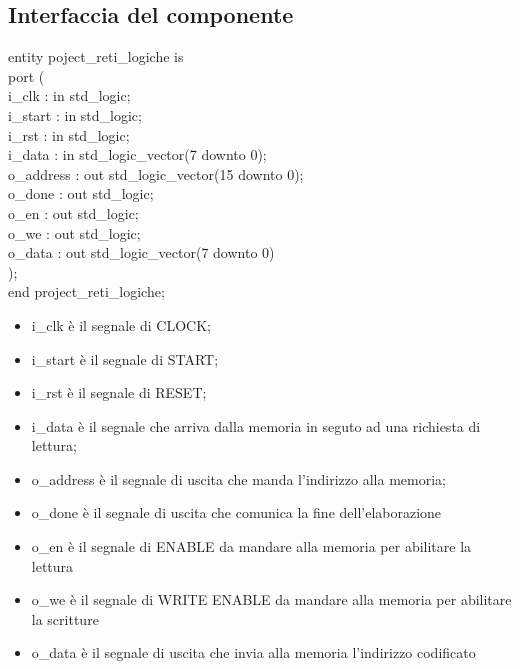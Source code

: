 \documentclass{article}
\newcommand\tab[1][1cm]{\hspace*{#1}}
\begin{document}
\subsection{Interfaccia del componente}
{\selectfont
entity poject\_reti\_logiche is\\
\tab port (\\
\tab\tab i\_clk\hspace*{1,5cm} : in std\_logic;\\
\tab\tab i\_start\hspace*{1,1cm} : in std\_logic;\\
\tab\tab i\_rst\hspace*{1,5cm} : in std\_logic;\\
\tab\tab i\_data\hspace*{1,3cm} : in std\_logic\_vector(7 downto 0);\\
\tab\tab o\_address\hspace*{0,7cm} : out std\_logic\_vector(15 downto 0);\\
\tab\tab o\_done\hspace*{1,3cm} : out std\_logic;\\
\tab\tab o\_en\hspace*{1,7cm} : out std\_logic;\\
\tab\tab o\_we\hspace*{1,7cm} : out std\_logic;\\
\tab\tab o\_data\hspace*{1,3cm} : out std\_logic\_vector(7 downto 0)\\
\tab );\\
end project\_reti\_logiche;
}
\begin{itemize}
\vspace{5mm} %
\item i\_clk è il segnale di CLOCK;
\item i\_start è il segnale di START;
\item i\_rst è il segnale di RESET;
\item i\_data è il segnale che arriva dalla memoria in seguto ad una richiesta di lettura;
\item o\_address è il segnale di uscita che manda l'indirizzo alla memoria;
\item o\_done è il segnale di uscita che comunica la fine dell'elaborazione
\item o\_en è il segnale di ENABLE da mandare alla memoria per abilitare la lettura
\item o\_we è il segnale di WRITE ENABLE da mandare alla memoria per abilitare la scritture
\item o\_data è il segnale di uscita che invia alla memoria l'indirizzo codificato
\end{itemize}
\pagebreak
\end{document}
